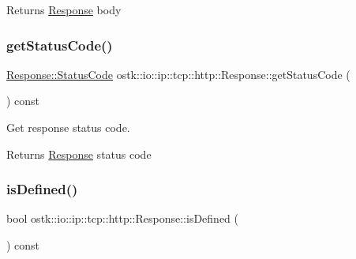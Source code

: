 \begin{DoxyReturn}{Returns}
\hyperlink{classostk_1_1io_1_1ip_1_1tcp_1_1http_1_1_response}{Response} body 
\end{DoxyReturn}
\mbox{\label{classostk_1_1io_1_1ip_1_1tcp_1_1http_1_1_response_a180c8df8a6a7c0b97acd1e5d3a01e981}} 
\subsubsection{\texorpdfstring{get\+Status\+Code()}{getStatusCode()}}
{\footnotesize\ttfamily \hyperlink{classostk_1_1io_1_1ip_1_1tcp_1_1http_1_1_response_af537657bbf13ea832203957144230c36}{Response\+::\+Status\+Code} ostk\+::io\+::ip\+::tcp\+::http\+::\+Response\+::get\+Status\+Code (\begin{DoxyParamCaption}{ }\end{DoxyParamCaption}) const}



Get response status code. 

\begin{DoxyReturn}{Returns}
\hyperlink{classostk_1_1io_1_1ip_1_1tcp_1_1http_1_1_response}{Response} status code 
\end{DoxyReturn}
\mbox{\label{classostk_1_1io_1_1ip_1_1tcp_1_1http_1_1_response_afc78e507b0c295a20d9ef90748deb32b}} 
\subsubsection{\texorpdfstring{is\+Defined()}{isDefined()}}
{\footnotesize\ttfamily bool ostk\+::io\+::ip\+::tcp\+::http\+::\+Response\+::is\+Defined (\begin{DoxyParamCaption}{ }\end{DoxyParamCaption}) const}



